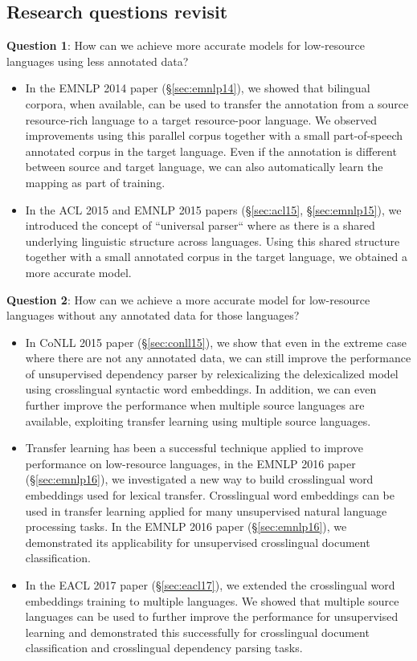 \documentclass[12pt,twoside,final,hidelinks]{ltthesis}
\theoremstyle{definition}
\newcommand\emnlpivp{EMNLP 2014 paper (\S\ref{sec:emnlp14})}
\newcommand\conllvp{CoNLL 2015 paper (\S\ref{sec:conll15})}
\newcommand\emnlpvip{EMNLP 2016 paper (\S\ref{sec:emnlp16})}
\newcommand\eaclviip{EACL 2017 paper (\S\ref{sec:eacl17})}
\begin{document}
\subsection{Research questions revisit}
\noindent \textbf{Question 1}: How can we achieve more accurate models for low-resource languages using less annotated data? 
\begin{itemize}
\item In the \emnlpivp, we showed that bilingual corpora, when available, can be used to transfer the annotation from a source resource-rich language to a target 
resource-poor language. We observed improvements using this parallel corpus together with a small part-of-speech annotated corpus in the target language. Even if 
the annotation is different between source and target language, we can also automatically learn the mapping as part of training. 
\item 	In the ACL 2015 and EMNLP 2015 papers (\S\ref{sec:acl15}, \S\ref{sec:emnlp15}), we introduced the concept of ``universal parser`` where as there is a shared underlying linguistic structure across languages. 
Using this shared structure together with a small annotated corpus in the target language, we obtained a more accurate model.  
\end{itemize}

\noindent \textbf{Question 2}: How can we achieve a more accurate model for low-resource languages without any annotated data for those languages?

\begin{itemize}
\item In \conllvp, we show that even in the extreme case where there are not any annotated data, we can still improve the performance of unsupervised dependency parser by relexicalizing the 
delexicalized model using crosslingual syntactic word embeddings. In addition, we can even further improve the performance when multiple source languages are available, exploiting transfer learning using multiple source languages. 
\item Transfer learning has been a successful technique applied to improve performance on low-resource languages, in the \emnlpvip, we investigated a new way to build crosslingual word embeddings used for lexical transfer. Crosslingual word embeddings can be used in transfer learning applied for many unsupervised natural 
language processing tasks. In the \emnlpvip, we demonstrated its applicability for unsupervised crosslingual document classification. 

\item In the \eaclviip, we extended the crosslingual word embeddings training to multiple languages. We showed that multiple source languages can be used to further improve the performance for unsupervised learning and demonstrated this successfully for crosslingual document classification and crosslingual dependency parsing tasks.  
\end{itemize}
\end{document}
